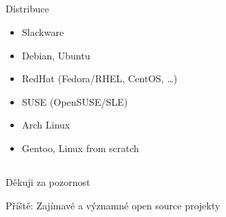 \documentclass{beamer}
\begin{document}
\subsection{}
\begin{frame}{Distribuce}
\begin{itemize}
\item Slackware
\item Debian, Ubuntu
\item RedHat (Fedora/RHEL, CentOS, \dots)
\item SUSE (OpenSUSE/SLE)
\item Arch Linux
\item Gentoo, Linux from scratch
\end{itemize}
\end{frame}


\subsection{}
\begin{frame}{Děkuji za pozornost}
\begin{center}
Příště: Zajímavé a významné open source projekty
\end{center}
\end{frame}
\end{document}
